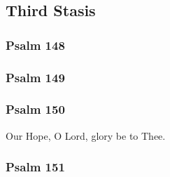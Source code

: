 \documentclass[12pt]{book}
\newcommand{\kathismabreak}{
  \medskip
  \begin{center}
  \begin{footnotesize}
  

  

  

  
  \end{footnotesize}
  \end{center}
  \smallbreak
}
\newcommand{\kathismaend}{
  \medskip
  \begin{center}
  \begin{footnotesize}
  

  

  Our Hope, O Lord, glory be to Thee.
  \end{footnotesize}
  \end{center}
  \smallbreak
}
\begin{document}
\kathismabreak

\subsection{Third Stasis}

\subsubsection{Psalm 148}


\subsubsection{Psalm 149}


\subsubsection{Psalm 150}


\kathismaend

\subsubsection{Psalm 151}

\end{document}

